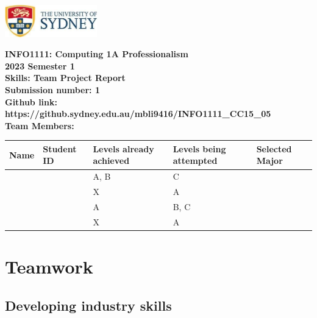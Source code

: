 \documentclass[a4paper, 11pt]{report}
\begin{document}
\begin{titlepage}
\begin{flushright}
\includegraphics[width=4cm]{USyd}\\[2cm]
\end{flushright}
\center 
\textbf{\huge INFO1111: Computing 1A Professionalism}\\[0.75cm]
\textbf{\huge 2023 Semester 1}\\[2cm]
\textbf{\huge Skills: Team Project Report}\\[3cm]

\textbf{\huge Submission number: 1}\\[0.75cm]
\textbf{Github link: https://github.sydney.edu.au/mbli9416/INFO1111\_CC15\_05}\\[0.75cm]
\textbf{\huge Team Members:}\\[0.75cm]

\begin{tabular}{|p{}|p{}|p{}|p{}|p{}|}
	\hline
	Name & Student ID & \raggedright{Levels already achieved} & \raggedright{Levels being attempted} & Selected Major \\
	\hline
	\hline
	\raggedright{\studA} & \sidA & A, B & C & \majA \\
	\raggedright{\studB} & \sidB & X & A & \majB \\
	\raggedright{\studC} & \sidC & A & B,  C & \majC \\
	\raggedright{\studD} & \sidD & X & A & \majD \\
	\hline
\end{tabular}
\thispagestyle{empty}
\end{titlepage}



\tableofcontents



\newpage
\section{Teamwork}
\label{sect-team}


\subsection{Developing industry skills}
\end{document}
